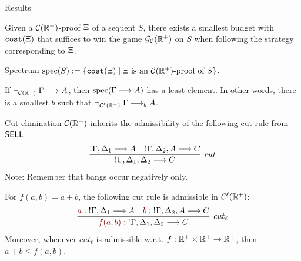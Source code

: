 \documentclass[9pt]{beamer}
\newcommand{\empha}[1]{{\color{darkgreen} #1}}
\newcommand{\emphdr}[1]{{\color{darkred} #1}}
\newcommand{\emphdo}[1]{{\color{darkorange} #1}}
\begin{document}
\begin{frame}{Results}
\begin{theorem}
Given a $\mathcal{C}(\mathbb{R}^+)$-proof $\Xi$ of a sequent $S$,  there exists a smallest budget with $\texttt{cost}(\Xi)$  that suffices to win the game $\mathcal{G}_{\mathcal{C}}(\mathbb{R}^+)$ on $S$ when following the strategy corresponding to $\Xi$.
\end{theorem}

\begin{block}{Spectrum}
$\text{spec}(S):=\{\texttt{cost}(\Xi)\mid\text{$\Xi$ is an $\mathcal{C}(\mathbb{R}^+)$-proof of $S$}\}$.
\end{block}
\begin{theorem}
If $\vdash_{\mathcal{C}(\mathbb{R}^+)}\Gamma\longrightarrow A$, then $\text{spec}(\Gamma\longrightarrow A)$ has a least element. In other words, there is a smallest $b$ such that $\vdash_{\mathcal{C}^\ell(\mathbb{R}^+)}\Gamma\longrightarrow_b A$.
\end{theorem}
\end{frame}

\begin{frame}{Cut-elimination}
 $\mathcal{C}(\mathbb{R}^+)$ inherits the admissibility of the following cut rule from~$\textsf{SELL}$:
\[
\infer[cut]{\nbang{}\Gamma,\Delta_1,\Delta_2\lra C}
	{ \nbang{}\Gamma,\Delta_1\lra A &
	\nbang{}\Gamma,\Delta_2,A\lra C
	}
\] 
\emphdo{Note:} Remember that bangs occur \empha{negatively} only.
\pause
\begin{theorem}\label{thm:cutAdm}
For $f(a,b)=a+b$, the following cut rule is admissible in $\mathcal{C}^\ell(\mathbb{R}^+)$:
\[
\infer[cut_\ell]{\emphdr{f(a,b):}\;\nbang{}\Gamma,\Delta_1,\Delta_2\lra C}
	{\emphdr{a:}\; \nbang{}\Gamma,\Delta_1\lra A &
	\emphdr{b:}\;\nbang{}\Gamma,\Delta_2,A\lra C
	}
\]
Moreover, whenever $cut_\ell$ is admissible w.r.t. $f:\mathbb{R}^+\times\mathbb{R}^+ \to \mathbb{R}^+$, then $a+b\leq f(a,b)$.
\end{theorem}
\end{frame}
\end{document}
